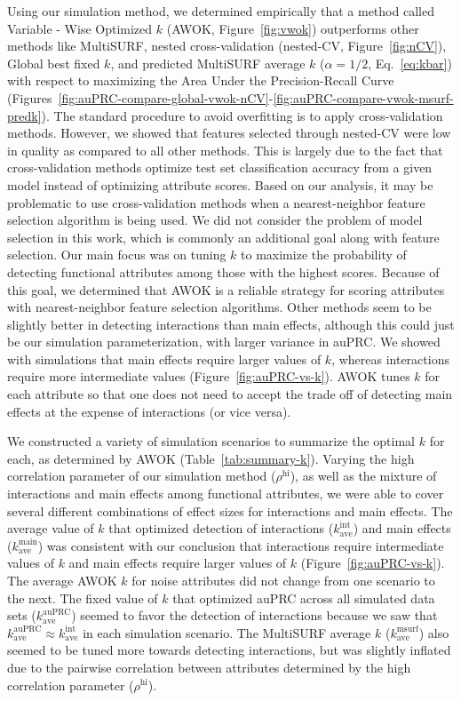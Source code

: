 \documentclass[10pt,letterpaper]{article}
\begin{document}
Using our simulation method, we determined empirically that a method called Variable - Wise Optimized $k$ (AWOK, Figure~\ref{fig:vwok}) outperforms other methods like MultiSURF, nested cross-validation (nested-CV, Figure~\ref{fig:nCV}), Global best fixed $k$, and predicted MultiSURF average $k$ ($\alpha=1/2$, Eq.~\ref{eq:kbar}) with respect to maximizing the Area Under the Precision-Recall Curve (Figures~\ref{fig:auPRC-compare-global-vwok-nCV}-\ref{fig:auPRC-compare-vwok-msurf-predk}). The standard procedure to avoid overfitting is to apply cross-validation methods. However, we showed that features selected through nested-CV were low in quality as compared to all other methods. This is largely due to the fact that cross-validation methods optimize test set classification accuracy from a given model instead of optimizing attribute scores. Based on our analysis, it may be problematic to use cross-validation methods when a nearest-neighbor feature selection algorithm is being used. We did not consider the problem of model selection in this work, which is commonly an additional goal along with feature selection. Our main focus was on tuning $k$ to maximize the probability of detecting functional attributes among those with the highest scores. Because of this goal, we determined that AWOK is a reliable strategy for scoring attributes with nearest-neighbor feature selection algorithms. Other methods seem to be slightly better in detecting interactions than main effects, although this could just be our simulation parameterization, with larger variance in auPRC. We showed with simulations that main effects require larger values of $k$, whereas interactions require more intermediate values (Figure~\ref{fig:auPRC-vs-k}). AWOK tunes $k$ for each attribute so that one does not need to accept the trade off of detecting main effects at the expense of interactions (or vice versa). 

We constructed a variety of simulation scenarios to summarize the optimal $k$ for each, as determined by AWOK (Table~\ref{tab:summary-k}). Varying the high correlation parameter of our simulation method ($\rho^\text{hi}$), as well as the mixture of interactions and main effects among functional attributes, we were able to cover several different combinations of effect sizes for interactions and main effects. The average value of $k$ that optimized detection of interactions ($k^\text{int}_\text{ave}$) and main effects ($k^\text{main}_\text{ave}$) was consistent with our conclusion that interactions require intermediate values of $k$ and main effects require larger values of $k$ (Figure~\ref{fig:auPRC-vs-k}). The average AWOK $k$ for noise attributes did not change from one scenario to the next. The fixed value of $k$ that optimized auPRC across all simulated data sets ($k^\text{auPRC}_\text{ave}$) seemed to favor the detection of interactions because we saw that $k^\text{auPRC}_\text{ave} \approx k^\text{int}_\text{ave}$ in each simulation scenario. The MultiSURF average $k$ ($k^\text{msurf}_\text{ave}$) also seemed to be tuned more towards detecting interactions, but was slightly inflated due to the pairwise correlation between attributes determined by the high correlation parameter ($\rho^\text{hi}$).
\end{document}
